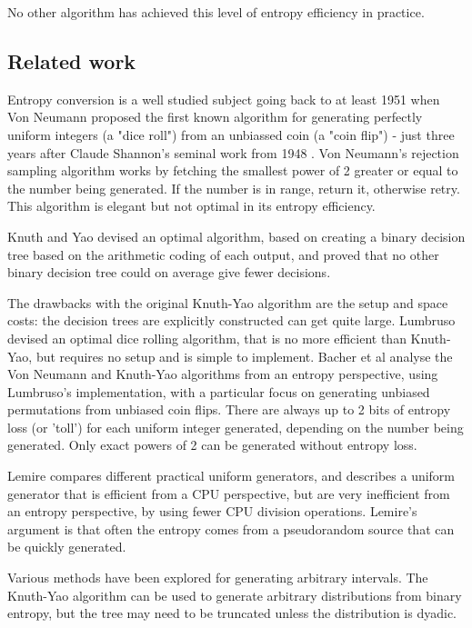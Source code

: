 \documentclass[12pt]{article}
\begin{document}
No other algorithm has achieved this level of entropy efficiency in practice.

\subsection{Related work}

Entropy conversion is a well studied subject going back to at least 1951 when Von Neumann \cite{neumann51} proposed the first known algorithm for generating perfectly uniform integers (a "dice roll") from an unbiassed coin (a "coin flip") - just three years after Claude Shannon's seminal work from 1948 \cite{shannon1948mathematical}. Von Neumann's rejection sampling algorithm works by fetching the smallest power of 2 greater or equal to the number being generated. If the number is in range, return it, otherwise retry. This algorithm is elegant but not optimal in its entropy efficiency.

Knuth and Yao \cite{Knuth1976TheCO} devised an optimal algorithm, based on creating a binary decision tree based on the arithmetic coding of each output, and proved that no other binary decision tree could on average give fewer decisions.

The drawbacks with the original Knuth-Yao algorithm are the setup and space costs: the decision trees are explicitly constructed can get quite large. Lumbruso \cite{lumbroso2013optimal} devised an optimal dice rolling algorithm, that is no more efficient than Knuth-Yao, but requires no setup and is simple to implement. Bacher et al \cite{bacher2017} analyse the Von Neumann and Knuth-Yao algorithms from an entropy perspective, using Lumbruso's implementation, with a particular focus on generating unbiased permutations from unbiased coin flips. There are always up to 2 bits of entropy loss (or 'toll') for each uniform integer generated, depending on the number being generated. Only exact powers of 2 can be generated without entropy loss.

Lemire \cite{lemire2019fast} compares different practical uniform generators, and describes a uniform generator that is efficient from a CPU perspective, but are very inefficient from an entropy perspective, by using fewer CPU division operations. Lemire's argument is that often the entropy comes from a pseudorandom source that can be quickly generated.

Various methods have been explored for generating arbitrary intervals.
The Knuth-Yao algorithm can be used to generate arbitrary distributions from binary entropy, but the tree may need to be truncated unless the distribution is dyadic.
\end{document}
